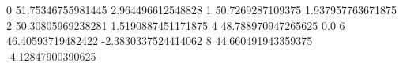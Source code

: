 0 51.75346755981445 2.964496612548828
1 50.7269287109375 1.937957763671875
2 50.30805969238281 1.5190887451171875
4 48.788970947265625 0.0
6 46.40593719482422 -2.3830337524414062
8 44.660491943359375 -4.12847900390625
